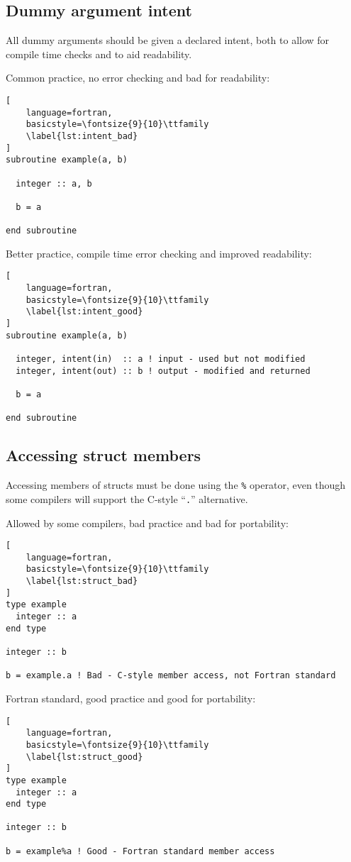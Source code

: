 \documentclass[11pt]{article}
\begin{document}
\subsection{Dummy argument intent}
All dummy arguments should be given a declared intent, both to allow for compile time checks and to aid readability.

Common practice, no error checking and bad for readability:
\begin{lstlisting}[
	language=fortran,
    basicstyle=\fontsize{9}{10}\ttfamily
    \label{lst:intent_bad}
]
subroutine example(a, b)

  integer :: a, b

  b = a

end subroutine
\end{lstlisting}

Better practice, compile time error checking and improved readability:
\begin{lstlisting}[
	language=fortran,
    basicstyle=\fontsize{9}{10}\ttfamily
    \label{lst:intent_good}
]
subroutine example(a, b)

  integer, intent(in)  :: a ! input - used but not modified
  integer, intent(out) :: b ! output - modified and returned

  b = a

end subroutine
\end{lstlisting}

\subsection{Accessing struct members}
Accessing members of structs must be done using the \texttt{\%} operator, even though some compilers will support 
the C-style ``\texttt{.}'' alternative.

Allowed by some compilers, bad practice and bad for portability:
\begin{lstlisting}[
	language=fortran,
    basicstyle=\fontsize{9}{10}\ttfamily
    \label{lst:struct_bad}
]
type example
  integer :: a
end type

integer :: b

b = example.a ! Bad - C-style member access, not Fortran standard
\end{lstlisting}

Fortran standard, good practice and good for portability:
\begin{lstlisting}[
	language=fortran,
    basicstyle=\fontsize{9}{10}\ttfamily
    \label{lst:struct_good}
]
type example
  integer :: a
end type

integer :: b

b = example%a ! Good - Fortran standard member access
\end{lstlisting}
\end{document}
